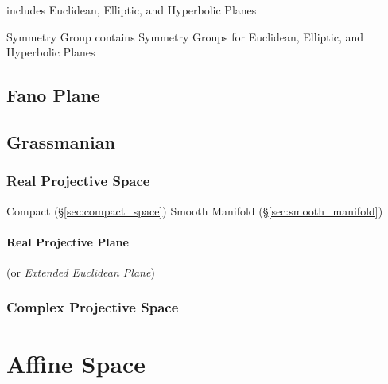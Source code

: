 includes Euclidean, Elliptic, and Hyperbolic Planes

Symmetry Group contains Symmetry Groups for Euclidean, Elliptic, and
Hyperbolic Planes



\subsection{Fano Plane}\label{sec:fano_plane}

\subsection{Grassmanian}\label{sec:grassmanian}

\subsubsection{Real Projective Space}\label{sec:real_projective_space}

Compact (\S\ref{sec:compact_space}) Smooth Manifold
(\S\ref{sec:smooth_manifold})



\paragraph{Real Projective Plane}\label{sec:real_projective_plane}\hfill

(or \emph{Extended Euclidean Plane})



\subsubsection{Complex Projective Space}
\label{sec:complex_projective_space}



\section{Affine Space}\label{sec:affine_space}


